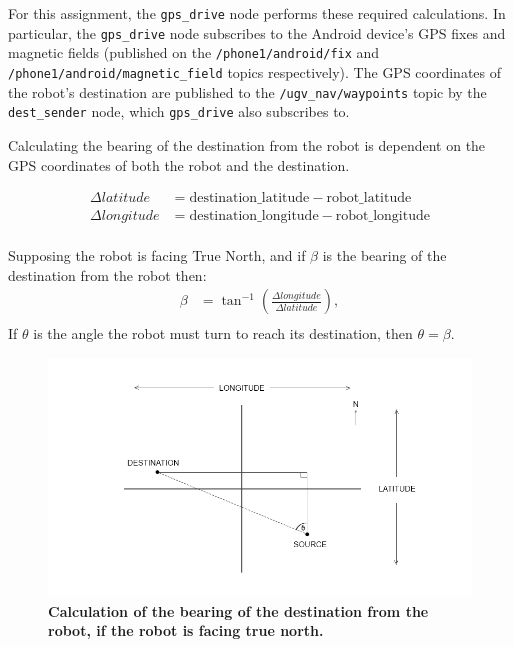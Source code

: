 \documentclass[titlepage,12pt,a4paper]{article}
\begin{document}
For this assignment, the \verb|gps_drive| node performs these required calculations. In particular, the \verb|gps_drive| node subscribes to the Android device's GPS fixes and magnetic fields (published on the \verb|/phone1/android/fix| and \verb|/phone1/android/magnetic_field| topics respectively). The GPS coordinates of the robot's destination are published to the  \verb|/ugv_nav/waypoints| topic by the \verb|dest_sender| node, which \verb|gps_drive| also subscribes to.

Calculating the bearing of the destination from the robot is dependent on the GPS coordinates of both the robot and the destination.

\begin{align*}
	\Delta{latitude}   	&= 	\text{destination\_latitude} - \text{robot\_latitude} \\
	\Delta{longitude}	&= 	\text{destination\_longitude} - \text{robot\_longitude} \\
\end{align*}

Supposing the robot is facing True North, and if $\beta$ is the bearing of the destination from the robot then:
\begin{align*}
	\beta		&=	\tan^{-1}({\frac{\Delta{longitude}}{\Delta{latitude}}}),\\
\end{align*}
If $\theta$ is the angle the robot must turn to reach its destination, then $\theta = \beta$.

\begin{figure}[h]
	\centering
	\includegraphics[scale=0.5]{bearings.png}
	\caption{\textbf{Calculation of the bearing of the destination from the robot, if the robot is facing true north.}}
\end{figure}


\pagebreak
\end{document}

